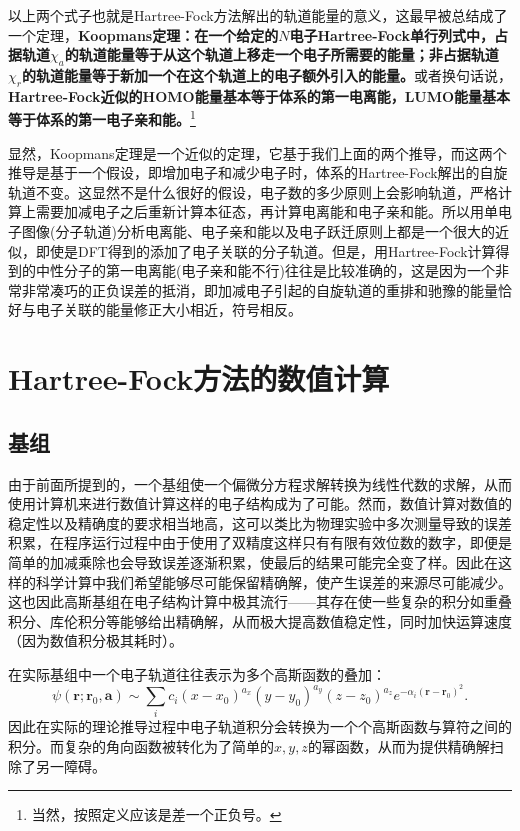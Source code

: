 \documentclass[12pt,a4paper,openany,twoside]{book}
\numberwithin{equation}{section}
\begin{document}
          以上两个式子也就是Hartree-Fock方法解出的轨道能量的意义，这最早被总结成了一个定理，\textbf{Koopmans定理：在一个给定的$N$电子Hartree-Fock单行列式中，占据轨道$\chi_a$的轨道能量等于从这个轨道上移走一个电子所需要的能量；非占据轨道$\chi_r$的轨道能量等于新加一个在这个轨道上的电子额外引入的能量。}或者换句话说，\textbf{Hartree-Fock近似的HOMO能量基本等于体系的第一电离能，LUMO能量基本等于体系的第一电子亲和能。}\footnote{当然，按照定义应该是差一个正负号。}

          显然，Koopmans定理是一个近似的定理，它基于我们上面的两个推导，而这两个推导是基于一个假设，即增加电子和减少电子时，体系的Hartree-Fock解出的自旋轨道不变。这显然不是什么很好的假设，电子数的多少原则上会影响轨道，严格计算上需要加减电子之后重新计算本征态，再计算电离能和电子亲和能。所以用单电子图像(分子轨道)分析电离能、电子亲和能以及电子跃迁原则上都是一个很大的近似，即使是DFT得到的添加了电子关联的分子轨道。但是，用Hartree-Fock计算得到的中性分子的第一电离能(电子亲和能不行)往往是比较准确的，这是因为一个非常非常凑巧的正负误差的抵消，即加减电子引起的自旋轨道的重排和驰豫的能量恰好与电子关联的能量修正大小相近，符号相反。

      \section{Hartree-Fock方法的数值计算}
        \subsection{基组}
          由于前面所提到的，一个基组使一个偏微分方程求解转换为线性代数的求解，从而使用计算机来进行数值计算这样的电子结构成为了可能。然而，数值计算对数值的稳定性以及精确度的要求相当地高，这可以类比为物理实验中多次测量导致的误差积累，在程序运行过程中由于使用了双精度这样只有有限有效位数的数字，即便是简单的加减乘除也会导致误差逐渐积累，使最后的结果可能完全变了样。因此在这样的科学计算中我们希望能够尽可能保留精确解，使产生误差的来源尽可能减少。这也因此高斯基组在电子结构计算中极其流行——其存在使一些复杂的积分如重叠积分、库伦积分等能够给出精确解，从而极大提高数值稳定性，同时加快运算速度（因为数值积分极其耗时）。

          在实际基组中一个电子轨道往往表示为多个高斯函数的叠加：
          \begin{equation}
            \psi (\boldsymbol{r};\boldsymbol{r}_0,\boldsymbol{a}) \sim \sum_i c_i (x-x_0)^{a_x}(y-y_0)^{a_y}(z-z_0)^{a_z} e^{- \alpha_i (\boldsymbol{r} - \boldsymbol{r}_0)^2}.
          \end{equation}
          因此在实际的理论推导过程中电子轨道积分会转换为一个个高斯函数与算符之间的积分。而复杂的角向函数被转化为了简单的$x,y,z$的幂函数，从而为提供精确解扫除了另一障碍。
\end{document}
